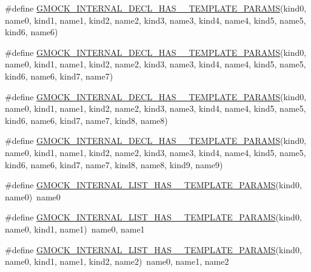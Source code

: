 \begin{DoxyCompactItemize}
\item 
\#define \mbox{\hyperlink{gmock-generated-actions_8h_aaafa5e8b1a116aa8e7f88653415e60cd}{G\+M\+O\+C\+K\+\_\+\+I\+N\+T\+E\+R\+N\+A\+L\+\_\+\+D\+E\+C\+L\+\_\+\+H\+A\+S\+\_\+\_\+\+T\+E\+M\+P\+L\+A\+T\+E\+\_\+\+P\+A\+R\+A\+MS}}(kind0,  name0,  kind1,  name1,  kind2,  name2,  kind3,  name3,  kind4,  name4,  kind5,  name5,  kind6,  name6)
\item 
\#define \mbox{\hyperlink{gmock-generated-actions_8h_a8d8ec2523daa6fc6c5b8f6a45898e0b1}{G\+M\+O\+C\+K\+\_\+\+I\+N\+T\+E\+R\+N\+A\+L\+\_\+\+D\+E\+C\+L\+\_\+\+H\+A\+S\+\_\+\_\+\+T\+E\+M\+P\+L\+A\+T\+E\+\_\+\+P\+A\+R\+A\+MS}}(kind0,  name0,  kind1,  name1,  kind2,  name2,  kind3,  name3,  kind4,  name4,  kind5,  name5,  kind6,  name6,  kind7,  name7)
\item 
\#define \mbox{\hyperlink{gmock-generated-actions_8h_ae6dd478ff5757fa4e66ef2dcf6e22325}{G\+M\+O\+C\+K\+\_\+\+I\+N\+T\+E\+R\+N\+A\+L\+\_\+\+D\+E\+C\+L\+\_\+\+H\+A\+S\+\_\+\_\+\+T\+E\+M\+P\+L\+A\+T\+E\+\_\+\+P\+A\+R\+A\+MS}}(kind0,  name0,  kind1,  name1,  kind2,  name2,  kind3,  name3,  kind4,  name4,  kind5,  name5,  kind6,  name6,  kind7,  name7,  kind8,  name8)
\item 
\#define \mbox{\hyperlink{gmock-generated-actions_8h_aa3db5758c68ca3a45a795d91fea7bb42}{G\+M\+O\+C\+K\+\_\+\+I\+N\+T\+E\+R\+N\+A\+L\+\_\+\+D\+E\+C\+L\+\_\+\+H\+A\+S\+\_\+\_\+\+T\+E\+M\+P\+L\+A\+T\+E\+\_\+\+P\+A\+R\+A\+MS}}(kind0,  name0,  kind1,  name1,  kind2,  name2,  kind3,  name3,  kind4,  name4,  kind5,  name5,  kind6,  name6,  kind7,  name7,  kind8,  name8,  kind9,  name9)
\item 
\#define \mbox{\hyperlink{gmock-generated-actions_8h_a900f637cda387230021133903f5e078b}{G\+M\+O\+C\+K\+\_\+\+I\+N\+T\+E\+R\+N\+A\+L\+\_\+\+L\+I\+S\+T\+\_\+\+H\+A\+S\+\_\+\_\+\+T\+E\+M\+P\+L\+A\+T\+E\+\_\+\+P\+A\+R\+A\+MS}}(kind0,  name0)~name0
\item 
\#define \mbox{\hyperlink{gmock-generated-actions_8h_ab89cb2aad7a5ededf9397ffd58fb8a9a}{G\+M\+O\+C\+K\+\_\+\+I\+N\+T\+E\+R\+N\+A\+L\+\_\+\+L\+I\+S\+T\+\_\+\+H\+A\+S\+\_\+\_\+\+T\+E\+M\+P\+L\+A\+T\+E\+\_\+\+P\+A\+R\+A\+MS}}(kind0,  name0,  kind1,  name1)~name0, name1
\item 
\#define \mbox{\hyperlink{gmock-generated-actions_8h_a1f3bd0693e586000f0b8a5324183b47f}{G\+M\+O\+C\+K\+\_\+\+I\+N\+T\+E\+R\+N\+A\+L\+\_\+\+L\+I\+S\+T\+\_\+\+H\+A\+S\+\_\+\_\+\+T\+E\+M\+P\+L\+A\+T\+E\+\_\+\+P\+A\+R\+A\+MS}}(kind0,  name0,  kind1,  name1,  kind2,  name2)~name0, name1, name2
\item 

\end{DoxyCompactItemize}
